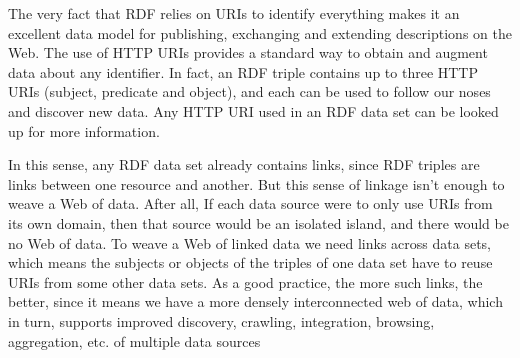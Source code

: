 The very fact that RDF relies on URIs to identify
everything makes it an excellent data model for publishing,
exchanging and extending descriptions on the Web. The use of HTTP URIs
provides a standard way to obtain and augment data about any 
identifier. In fact, an RDF triple contains up to three HTTP URIs
(subject, predicate and object), and each can be used to follow our
noses and discover new data. Any HTTP URI used in an RDF data set
can be looked up for more information.

In this sense,   any RDF data set already contains links, since
RDF triples are links between one resource and another.  
But this sense of linkage isn't enough to weave a Web of data.  After all, 
If each data source were to only use  URIs from  its own domain, then
that source would be an isolated island,  and there would be no
Web of data.  To
weave a Web of linked data we need links across data sets,  which means the
subjects or objects of the triples of one data set have to reuse
URIs from some other data sets.  As a good practice, the more such links, the better, 
since it means we have a more densely interconnected web of data, which in turn, supports
improved discovery,  crawling, integration, browsing,
aggregation, etc. of multiple data sources


